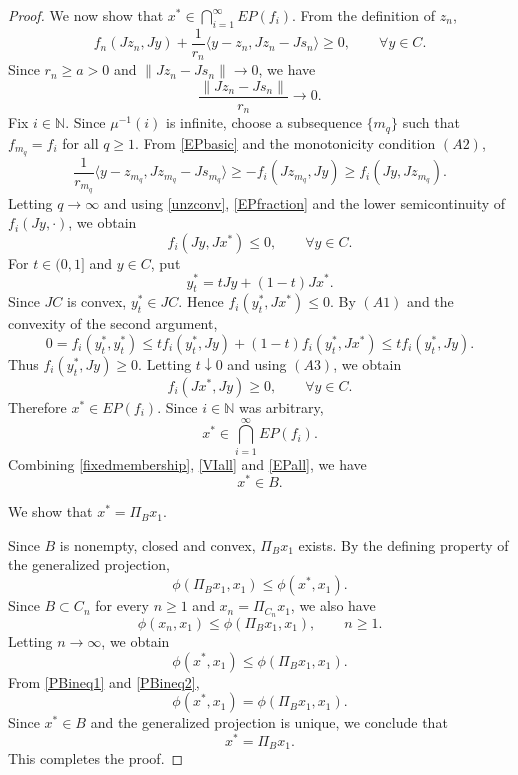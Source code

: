 \documentclass[10pt,a4paper]{amsart}
\begin{document}
\begin{proof}
We now show that $x^{*}\in \bigcap_{i=1}^{\infty}EP(f_i)$. From the definition of $z_n$,
\begin{equation}\label{EPbasic}
f_n(Jz_n,Jy)+\frac{1}{r_n}\langle y-z_n,Jz_n-Js_n\rangle\geq 0,
\qquad \forall y\in C.
\end{equation}
Since $r_n\geq a>0$ and $\|Jz_n-Js_n\|\to 0$, we have
\begin{equation}\label{EPfraction}
\frac{\|Jz_n-Js_n\|}{r_n}\to 0.
\end{equation}
Fix $i\in\mathbb{N}$. Since $\mu^{-1}(i)$ is infinite, choose a subsequence $\{m_q\}$ such that $f_{m_q}=f_i$ for all $q\geq 1$. From \eqref{EPbasic} and the monotonicity condition $(A2)$,
\[
\frac{1}{r_{m_q}}\langle y-z_{m_q},Jz_{m_q}-Js_{m_q}\rangle\geq -f_i(Jz_{m_q},Jy)\geq f_i(Jy,Jz_{m_q}).
\]
Letting $q\to\infty$ and using \eqref{unzconv}, \eqref{EPfraction} and the lower semicontinuity of $f_i(Jy,\cdot)$, we obtain
\[
f_i(Jy,Jx^{*})\leq 0,
\qquad \forall y\in C.
\]
For $t\in(0,1]$ and $y\in C$, put
\[
y_t^{*}=tJy+(1-t)Jx^{*}.
\]
Since $JC$ is convex, $y_t^{*}\in JC$. Hence $f_i(y_t^{*},Jx^{*})\leq 0$. By $(A1)$ and the convexity of the second argument,
\[
0=f_i(y_t^{*},y_t^{*})\leq t f_i(y_t^{*},Jy)+(1-t)f_i(y_t^{*},Jx^{*})\leq t f_i(y_t^{*},Jy).
\]
Thus $f_i(y_t^{*},Jy)\geq 0$. Letting $t\downarrow 0$ and using $(A3)$, we obtain
\[
f_i(Jx^{*},Jy)\geq 0,
\qquad \forall y\in C.
\]
Therefore $x^{*}\in EP(f_i)$. Since $i\in\mathbb{N}$ was arbitrary,
\begin{equation}\label{EPall}
x^{*}\in \bigcap_{i=1}^{\infty}EP(f_i).
\end{equation}
Combining \eqref{fixedmembership}, \eqref{VIall} and \eqref{EPall}, we have
\begin{equation}\label{xinstarB}
x^{*}\in B.
\end{equation}

 We show that $x^{*}=\Pi_Bx_1$.

Since $B$ is nonempty, closed and convex, $\Pi_Bx_1$ exists. By the defining property of the generalized projection,
\begin{equation}\label{PBineq1}
\phi(\Pi_Bx_1,x_1)\leq \phi(x^{*},x_1).
\end{equation}
Since $B\subset C_n$ for every $n\geq 1$ and $x_n=\Pi_{C_n}x_1$, we also have
\[
\phi(x_n,x_1)\leq \phi(\Pi_Bx_1,x_1),
\qquad n\geq 1.
\]
Letting $n\to\infty$, we obtain
\begin{equation}\label{PBineq2}
\phi(x^{*},x_1)\leq \phi(\Pi_Bx_1,x_1).
\end{equation}
From \eqref{PBineq1} and \eqref{PBineq2},
\[
\phi(x^{*},x_1)=\phi(\Pi_Bx_1,x_1).
\]
Since $x^{*}\in B$ and the generalized projection is unique, we conclude that
\[
x^{*}=\Pi_Bx_1.
\]
This completes the proof.
\end{proof}
\end{document}
